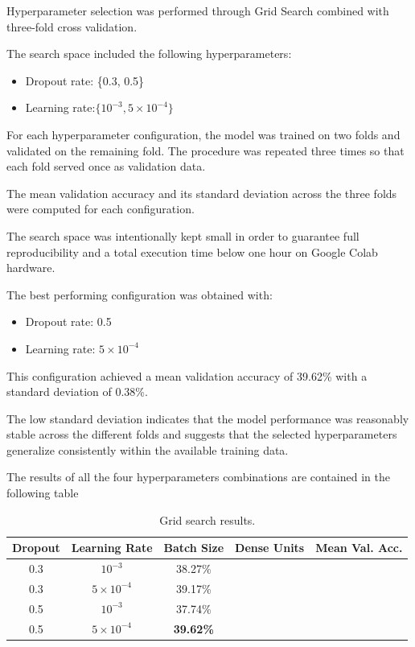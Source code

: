 \documentclass{article}
\begin{document}
Hyperparameter selection was performed through Grid Search combined
with three-fold cross validation.

The search space included the following hyperparameters:

\begin{itemize}
\item Dropout rate: \{0.3, 0.5\}
\item Learning rate:$\{10^{-3}, 5 \times 10^{-4}\}$ 
\end{itemize}

For each hyperparameter configuration, the model was trained on two
folds and validated on the remaining fold. The procedure was repeated
three times so that each fold served once as validation data.

The mean validation accuracy and its standard deviation across the
three folds were computed for each configuration.

The search space was intentionally kept small in order to guarantee
full reproducibility and a total execution time below one hour on
Google Colab hardware.


The best performing configuration was obtained with:

\begin{itemize}
\item Dropout rate: 0.5
\item Learning rate: $5 \times 10^{-4}$
\end{itemize}

This configuration achieved a mean validation accuracy of
39.62\% with a standard deviation of 0.38\%.



The low standard deviation indicates that the model performance was
reasonably stable across the different folds and suggests that the
selected hyperparameters generalize consistently within the available
training data.

The results of all the four hyperparameters combinations are contained in the following table

\begin{table}[htbp]
\centering
\caption{Grid search results.}
\begin{tabular}{ccccc}
\hline
Dropout & Learning Rate & Batch Size & Dense Units & Mean Val. Acc. \\
\hline
0.3 & $10^{-3}$  & 38.27\% \\
0.3 & $5\times10^{-4}$ & 39.17\% \\
0.5 & $10^{-3}$ & 37.74\% \\
0.5 & $5\times10^{-4}$ & \textbf{39.62\%} \\
\hline
\end{tabular}
\end{table}
\end{document}
